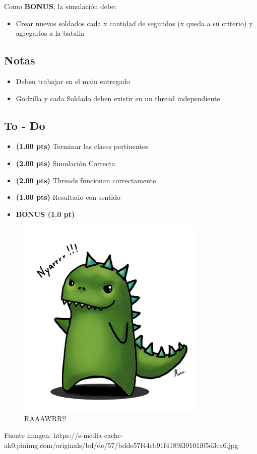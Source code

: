 \documentclass[10pt]{extarticle}
\begin{document}
Como \textbf{BONUS}, la simulación debe:

\begin{itemize}
	\item
	Crear nuevos soldados cada x cantidad de segundos (x queda a su criterio) y agregarlos a la batalla
\end{itemize}

\subsection*{Notas}

\begin{itemize}
    \item 
    Deben trabajar en el main entregado
	\item
	Godzilla y cada Soldado deben existir en un thread independiente.

\end{itemize}

\subsection*{To - Do}

\begin{itemize}
	\item
	\textbf{(1.00 pts)} Terminar las clases pertinentes
	\item
	\textbf{(2.00 pts)} Simulación Correcta
	\item
	\textbf{(2.00 pts)} Threads funcionan correctamente
	\item
	\textbf{(1.00 pts)} Resultado con sentido
	\item
	\textbf{BONUS (1.0 pt)} 
\end{itemize}

\begin{figure}[ht!]
\centering
\includegraphics[width=90mm]{Gozilla.jpg}
\caption{RAAAWRR!! \label{overflow}}
\end{figure}

Fuente imagen: https://s-media-cache-ak0.pinimg.com/originals/bd/de/57/bdde57f44cb91f4189f39101f05d3ca6.jpg
\end{document}
